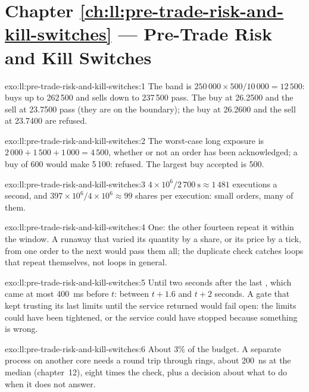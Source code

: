 \section*{Chapter \ref{ch:ll:pre-trade-risk-and-kill-switches} --- Pre-Trade Risk and Kill Switches}

\begin{solution}{exo:ll:pre-trade-risk-and-kill-switches:1}
The band is $250\,000 \times 500 / 10\,000 = 12\,500$: buys up to 262\,500 and sells down to 237\,500 pass. The buy at 26.2500
and the sell at 23.7500 pass (they are on the boundary); the buy at 26.2600 and the sell at 23.7400 are refused.
\end{solution}

\begin{solution}{exo:ll:pre-trade-risk-and-kill-switches:2}
The worst-case long exposure is $2\,000 + 1\,500 + 1\,000 = 4\,500$, whether or not an order has been acknowledged; a buy of
600 would make 5\,100: refused. The largest buy accepted is 500.
\end{solution}

\begin{solution}{exo:ll:pre-trade-risk-and-kill-switches:3}
$4 \times 10^6 / 2\,700~\text{s} \approx 1\,481$ executions a second, and $397 \times 10^6 / 4 \times 10^6 \approx 99$ shares per
execution: small orders, many of them.
\end{solution}

\begin{solution}{exo:ll:pre-trade-risk-and-kill-switches:4}
One: the other fourteen repeat it within the window. A runaway that varied its quantity by a share, or its price by a tick,
from one order to the next would pass them all; the duplicate check catches loops that repeat themselves, not loops in general.
\end{solution}

\begin{solution}{exo:ll:pre-trade-risk-and-kill-switches:5}
Until two seconds after the last , which came at most \qty{400}{\milli\second} before $t$: between $t + 1.6$ and
$t + 2$ seconds. A gate that kept trusting its last limits until the service returned would fail open: the limits could have
been tightened, or the service could have stopped because something is wrong.
\end{solution}

\begin{solution}{exo:ll:pre-trade-risk-and-kill-switches:6}
About 3\% of the budget. A separate process on another core needs a round trip through rings, about \qty{200}{\nano\second}
at the median (chapter~12), eight times the check, plus a decision about what to do when it does not answer.
\end{solution}

